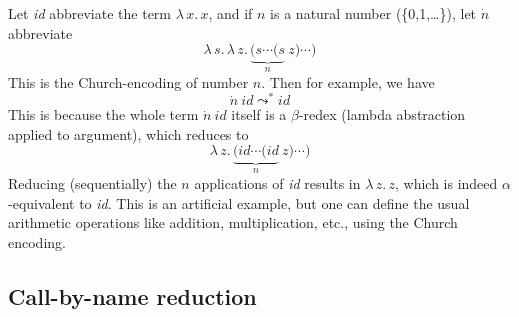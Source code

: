 \documentclass{article}
\begin{document}
Let \textit{id} abbreviate the term $\lambda\,x.\, x$, and if $n$ is a natural number (\{0,1,\ldots\}),
let $\dot{n}$ abbreviate
\[
\lambda\,s.\, \lambda\,z.\, \underbrace{(s \cdots (s}_n\ z)\cdots)
\]
\noindent This is the Church-encoding of number $n$.  Then for example, we have
\[
\dot{n}\ \textit{id} \leadsto^* \textit{id}
\]
\noindent This is because the whole term $\dot{n}\ \textit{id}$ itself is a $\beta$-redex
(lambda abstraction applied to argument), which reduces to
\[
\lambda\,z.\, \underbrace{(\textit{id} \cdots (\textit{id}}_n\ z)\cdots)
\]
\noindent Reducing (sequentially) the $n$ applications of \textit{id} results in $\lambda\,z.\, z$,
which is indeed $\alpha$-equivalent to \textit{id}.  This is an artificial example,
but one can define the usual arithmetic operations like addition, multiplication, etc., using
the Church encoding.

\subsection{Call-by-name reduction}
\end{document}
